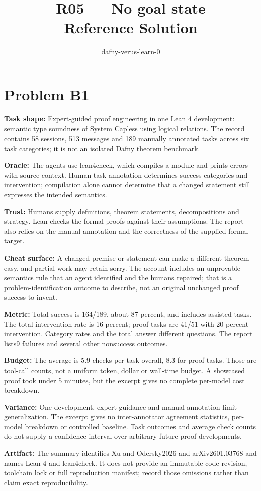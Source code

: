 \documentclass[11pt]{article}
\title{R05 --- No goal state \\ \large Reference Solution}
\author{dafny-verus-learn-0}
\date{}
\begin{document}
\maketitle
\section*{Problem B1}\label{ans:B1}
\begin{answer}
\textbf{Task shape:} Expert-guided proof engineering in one Lean 4 development: semantic type soundness of System Capless using logical relations. The record contains 58 sessions, 513 messages and 189 manually annotated tasks across six task categories; it is not an isolated Dafny theorem benchmark.

\textbf{Oracle:} The agents use lean4check, which compiles a module and prints errors with source context. Human task annotation determines success categories and intervention; compilation alone cannot determine that a changed statement still expresses the intended semantics.

\textbf{Trust:} Humans supply definitions, theorem statements, decompositions and strategy. Lean checks the formal proofs against their assumptions. The report also relies on the manual annotation and the correctness of the supplied formal target.

\textbf{Cheat surface:} A changed premise or statement can make a different theorem easy, and partial work may retain sorry. The account includes an unprovable semantics rule that an agent identified and the humans repaired; that is a problem-identification outcome to describe, not an original unchanged proof success to invent.

\textbf{Metric:} Total success is 164/189, about 87 percent, and includes assisted tasks. The total intervention rate is 16 percent; proof tasks are 41/51 with 20 percent intervention. Category rates and the total answer different questions. The report lists9 failures and several other nonsuccess outcomes.

\textbf{Budget:} The average is 5.9 checks per task overall, 8.3 for proof tasks. Those are tool-call counts, not a uniform token, dollar or wall-time budget. A showcased proof took under 5 minutes, but the excerpt gives no complete per-model cost breakdown.

\textbf{Variance:} One development, expert guidance and manual annotation limit generalization. The excerpt gives no inter-annotator agreement statistics, per-model breakdown or controlled baseline. Task outcomes and average check counts do not supply a confidence interval over arbitrary future proof developments.

\textbf{Artifact:} The summary identifies Xu and Odersky2026 and arXiv2601.03768 and names Lean 4 and lean4check. It does not provide an immutable code revision, toolchain lock or full reproduction manifest; record those omissions rather than claim exact reproducibility.
\end{answer}
\end{document}
